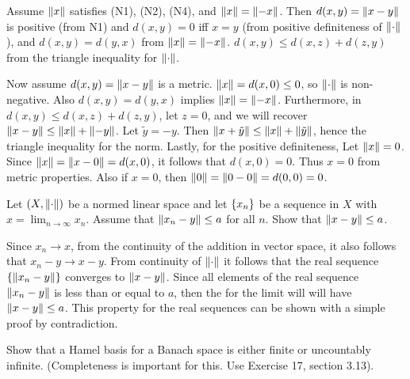 \begin{solution}
	Assume $ \norm{x} $ satisfies (N1), (N2), (N4), and $ \norm{x} = \norm{-x} $. Then $ d(x,y) = \norm{x-y} $ is positive (from N1) and $ d(x,y) = 0 $ iff $ x=y $ (from positive definiteness of $ \norm{\cdot} $), and $ d(x,y) = d(y,x) $ from $ \norm{x} = \norm{-x} $. $ d(x,y) \leq d(x,z) + d(z,y)  $ from the triangle inequality for $ \norm{\cdot} $. 
	
	Now assume $ d(x,y)  = \norm{x-y} $ is a metric. $ \norm{x} = d(x,0) \leq 0 $, so $ \norm{\cdot}$ is non-negative. Also $ d(x,y) = d(y,x) $ implies $ \norm{x} = \norm{-x} $. Furthermore, in $ d(x,y) \leq d(x,z) + d(z,y) $, let $ z=0 $, and we will recover $ \norm{x-y} \leq \norm{x} + \norm{-y} $. Let $ \tilde{y} = -y $. Then $ \norm{x+\tilde{y}} \leq \norm{x} + \norm{\tilde{y}} $, hence the triangle inequality for the norm. Lastly, for the positive definiteness, Let $ \norm{x} = 0 $. Since $ \norm{x} = \norm{x-0} = d(x,0) $, it follows that $ d(x,0) = 0 $. Thus $ x=0 $ from metric properties. Also if $ x=0 $, then $ \norm{0} = \norm{0-0} = d(0,0) = 0 $.
\end{solution}


\begin{problem}
	Let $ (X,\norm{\cdot}) $ be a normed linear space and let $ \{x_n\} $ be a sequence in $ X $ with $ x=\lim_{n\to\infty} x_n $. Assume that $ \norm{x_n-y} \leq a $ for all $ n $. Show that $ \norm{x-y} \leq a $. 
\end{problem}
\begin{solution}
	Since $ x_n \to x $, from the continuity of the addition in vector space, it also follows that $ x_n -y \to x-y $. From continuity of $ \norm{\cdot} $ it follows that the real sequence $ \{\norm{x_n-y}\} $ converges to $ \norm{x-y} $. Since all elements of the real sequence $ \norm{x_n-y} $ is less than or equal to $ a $, then the for the limit will will have $ \norm{x-y} \leq a $. This property for the real sequences can be shown with a simple proof by contradiction.
\end{solution}


\begin{problem}
	Show that a Hamel basis for a Banach space is either finite or uncountably infinite. (Completeness is important for this. Use Exercise 17, section 3.13).
\end{problem}

